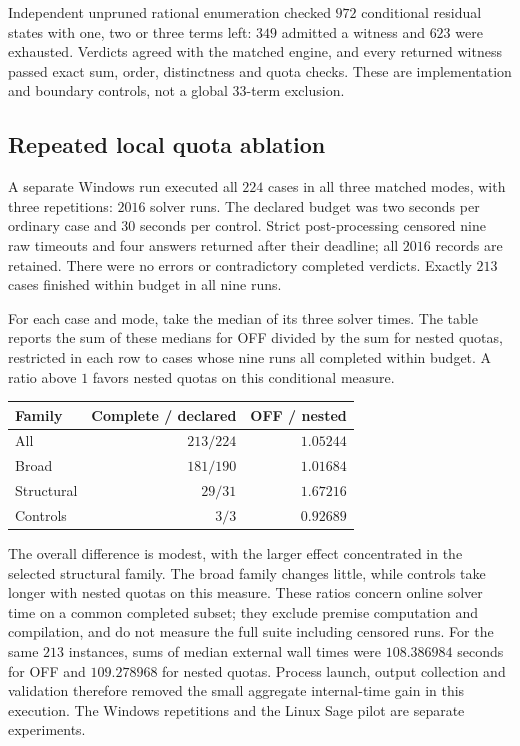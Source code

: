 \documentclass[10pt,a4paper]{article}
\begin{document}
Independent unpruned rational enumeration checked $972$ conditional residual
states with one, two or three terms left: $349$ admitted a witness and $623$ were
exhausted. Verdicts agreed with the matched engine, and every returned witness
passed exact sum, order, distinctness and quota checks. These are implementation
and boundary controls, not a global $33$-term exclusion.

\subsection{Repeated local quota ablation}
A separate Windows run executed all $224$ cases in all three matched modes,
with three repetitions: $2016$ solver runs. The declared budget was two seconds
per ordinary case and $30$ seconds per control. Strict post-processing censored
nine raw timeouts and four answers returned after their deadline; all $2016$
records are retained. There were no errors or contradictory completed verdicts.
Exactly $213$ cases finished within budget in all nine runs.

For each case and mode, take the median of its three solver times. The table
reports the sum of these medians for OFF divided by the sum for nested quotas,
restricted in each row to cases whose nine runs all completed within budget.
A ratio above $1$ favors nested quotas on this conditional measure.
\begin{center}
\begin{tabular}{lrr}
\toprule
Family & Complete / declared & OFF / nested \\
\midrule
All & $213/224$ & $1.05244$ \\
Broad & $181/190$ & $1.01684$ \\
Structural & $29/31$ & $1.67216$ \\
Controls & $3/3$ & $0.92689$ \\
\bottomrule
\end{tabular}
\end{center}
The overall difference is modest, with the larger effect concentrated in the
selected structural family. The broad family changes little, while controls
take longer with nested quotas on this measure. These ratios concern online
solver time on a common completed subset; they exclude premise computation and
compilation, and do not measure the full suite including censored runs. For the same $213$ instances, sums of median external wall times were
$108.386984$ seconds for OFF and $109.278968$ for nested quotas. Process launch,
output collection and validation therefore removed the small aggregate
internal-time gain in this execution. The Windows repetitions and the Linux
Sage pilot are separate experiments.
\end{document}
